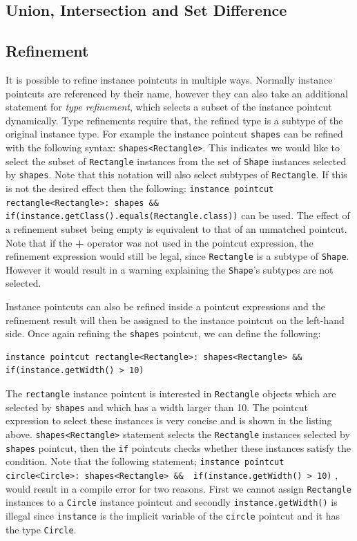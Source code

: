 \documentclass{llncs}
\begin{document}
\subsection{Union, Intersection and Set Difference}


\subsection{Refinement} 
It is possible to refine instance pointcuts in multiple ways. Normally instance pointcuts are referenced by their name, however they can also take an additional statement for \emph{type refinement}, which selects a subset of the instance pointcut dynamically. Type refinements require that, the refined type is a subtype of the original instance type. For example the instance pointcut \texttt{shapes} can be refined with the following syntax: \lstinline!shapes<Rectangle>!. This indicates we would like to select the subset of \texttt{Rectangle} instances from the set of \texttt{Shape} instances selected by \texttt{shapes}. Note that this notation will also select subtypes of \texttt{Rectangle}. If this is not the desired effect then the following: \lstinline!instance pointcut rectangle<Rectangle>: shapes && if(instance.getClass().equals(Rectangle.class))! can be used. The effect of a refinement subset being empty is equivalent to that of an unmatched pointcut. Note that if the \textbf{+} operator was not used in the pointcut expression, the refinement expression would still be legal, since \texttt{Rectangle} is a subtype of \texttt{Shape}. However it would result in a warning explaining the \texttt{Shape}'s subtypes are not selected.

Instance pointcuts can also be refined inside a pointcut expressions and the refinement result will then be assigned to the instance pointcut on the left-hand side. Once again refining the \texttt{shapes} pointcut, we can define the following:

\begin{lstlisting}[float=h!]
instance pointcut rectangle<Rectangle>: shapes<Rectangle> &&  if(instance.getWidth() > 10)
\end{lstlisting}

The \texttt{rectangle} instance pointcut is interested in \texttt{Rectangle} objects which are selected by \texttt{shapes} and which has a width larger than 10. The pointcut expression to select these instances is very concise and is shown in the listing above. \texttt{shapes<Rectangle>} statement selects the \texttt{Rectangle} instances selected by \texttt{shapes} pointcut, then the \texttt{if} pointcuts checks whether these instances satisfy the condition. Note that the following statement; \lstinline!instance pointcut circle<Circle>: shapes<Rectangle> &&  if(instance.getWidth() > 10)! , would result in a compile error for two reasons. First we cannot assign \texttt{Rectangle} instances to a \texttt{Circle} instance pointcut and secondly \texttt{instance.getWidth()} is illegal since \texttt{instance} is the implicit variable of the \texttt{circle} pointcut and it has the type \texttt{Circle}.
\end{document}
